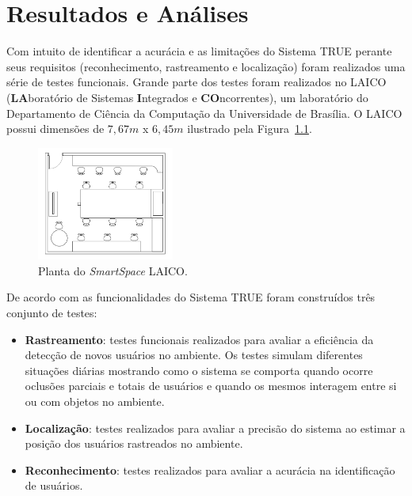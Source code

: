 \chapter{Resultados e Análises}
\label{cap:testes}

	Com intuito de identificar a acurácia e as limitações do Sistema TRUE perante
	seus requisitos (reconhecimento, rastreamento e localização) foram realizados
	uma série de testes funcionais. Grande parte dos testes foram realizados no LAICO
	(\textbf{LA}boratório de Sistemas \textbf{I}ntegrados e \textbf{CO}ncorrentes),
	um laboratório do Departamento de Ciência da Computação da Universidade de
	Brasília. O LAICO possui dimensões de $\displaystyle 7,67m$ x $\displaystyle
	6,45m$ ilustrado pela Figura~\ref{fig:laico}.

	\begin{figure}[htb]
		\begin{center}
 			\includegraphics[width=0.4\textwidth]{figuras/4.ProblemaEProposta/laico.png}
 		\end{center}
 		\caption{Planta do \textit{SmartSpace} LAICO.}
		\label{fig:laico}
	\end{figure}	

	De acordo com as funcionalidades do Sistema TRUE foram construídos três conjunto de testes:

	\begin{itemize}
		\item \textbf{Rastreamento}: testes funcionais realizados para avaliar a
		eficiência da detecção de novos usuários no ambiente. Os testes simulam
		diferentes situações diárias mostrando como o sistema se comporta quando
		ocorre oclusões parciais e totais de usuários e quando os mesmos interagem
		entre si ou com objetos no ambiente.

		\item \textbf{Localização}: testes realizados para avaliar a precisão do
		sistema ao estimar a posição dos usuários rastreados no ambiente.
		
		\item \textbf{Reconhecimento}: testes realizados para avaliar a acurácia na identificação de usuários.
	\end{itemize}


